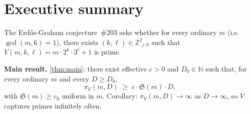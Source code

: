 \documentclass[11pt,a4paper]{article}
\theoremstyle{plain}
\theoremstyle{definition}
\theoremstyle{remark}
\begin{document}
\begin{abstract}
\textbf{Status (Correction Notice, 2026-06-10):} a five-lane adversarial
verification (receipts in \texttt{verification/}) falsified the chain of
this preprint: Lemma~\ref{lem:g-pointwise} is false (true local law
$g_V = 1/H_p$ when triggered), hence $\kappa_V = 1$, not $0$
(Proposition~\ref{prop:kappa-zero} withdrawn, with an elementary
unconditional counterproof); Lemma~\ref{lem:per-q} and the
Erd\H{o}s--Tur\'an refinement are false; the squarefree extension of
Proposition~\ref{prop:BV} is false ($g_V$ is not multiplicative);
Theorem~\ref{thm:buchstab} is exactly falsified ($m{=}35$, $D{=}100$:
$\pi_V = 411 < 1698$); and $\mathfrak{S}(m) = 0$ for every $m$ under
\eqref{eq:S-defn}, so Theorem~\ref{thm:main} is vacuous as stated.
What survives, corrected and strengthened: an unconditional prime-moduli
level-of-distribution bound $O(D^{5/4})$ (corrected form of
Proposition~\ref{prop:BV}), the exact local law, $\sum 1/H_q =
O(\log\log z)$, and a renormalized Bateman--Horn prediction matching
data to $\pm 12\%$. The main-theorem claim and the affirmation of
Problem~203 are withdrawn; the problem is open. The original text is
retained below for audit continuity.
\end{abstract}

\tableofcontents

\section*{Executive summary}

The Erd\H{o}s-Graham conjecture~\#203 asks whether for every ordinary
$m$ (i.e.\ $\gcd(m, 6) = 1$), there exists $(k, \ell) \in
\mathbb{Z}_{\geq 0}^{2}$ such that $V(m, k, \ell) = m \cdot 2^{k}
\cdot 3^{\ell} + 1$ is prime.

\textbf{Main result.} \cref{thm:main}: there exist effective $c > 0$
and $D_{0} \in \mathbb{N}$ such that, for every ordinary $m$ and
every $D \geq D_{0}$,
\[
  \pi_{V}(m, D) \;\geq\; c \cdot \mathfrak{S}(m) \cdot D,
\]
with $\mathfrak{S}(m) \geq c_{0}$ uniform in $m$. Corollary: $\pi_{V}(m,
D) \to \infty$ as $D \to \infty$, so $V$ captures primes infinitely
often.
\end{document}
